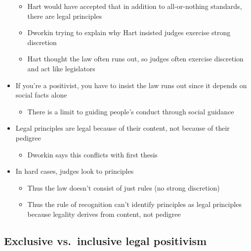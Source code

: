 \begin{itemize}
  \begin{itemize}
  \tightlist
  \item
    Hart would have accepted that in addition to all-or-nothing
    standards, there are legal principles
  \item
    Dworkin trying to explain why Hart insisted judges exercise strong
    discretion
  \item
    Hart thought the law often runs out, so judges often exercise
    discretion and act like legislators
  \end{itemize}
\item
  If you're a positivist, you have to insist the law runs out since it
  depends on social facts alone

  \begin{itemize}
  \tightlist
  \item
    There is a limit to guiding people's conduct through social guidance
  \end{itemize}
\item
  Legal principles are legal because of their content, not because of
  their pedigree

  \begin{itemize}
  \tightlist
  \item
    Dworkin says this conflicts with first thesis
  \end{itemize}
\item
  In hard cases, judges look to principles

  \begin{itemize}
  \tightlist
  \item
    Thus the law doesn't consist of just rules (no strong discretion)
  \item
    Thus the rule of recognition can't identify principles as legal
    principles because legality derives from content, not pedigree
  \end{itemize}
\end{itemize}

\hypertarget{exclusive-vs.-inclusive-legal-positivism}{%
\subsection{Exclusive vs.~inclusive legal
positivism}\label{exclusive-vs.-inclusive-legal-positivism}}

